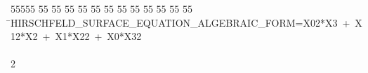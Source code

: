 %
%
\begin{tabbing}
55555 \= 55 \= 55 \= 55 \= 55 \= 55 \= 55 \= 55 \= 55 \= 55 \= 55 \= 55 \= 55 \= \>HIRSCHFELD\_SURFACE\_EQUATION\_ALGEBRAIC\_FORM=X02*X3\ +\ X12*X2\ +\ X1*X22\ +\ X0*X32\\[0pt]
\>\\[0pt]
2\>\end{tabbing}
